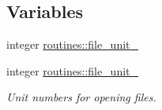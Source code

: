 \subsection*{Variables}
\begin{DoxyCompactItemize}
\item 
integer \mbox{\hyperlink{namespaceroutines_a4433ed4e6fbf0c81f38d8df1749be025}{routines\+::file\+\_\+unit\+\_}}
\item 
integer \mbox{\hyperlink{namespaceroutines_a806b34a65a0678e540be124100a0f908}{routines\+::file\+\_\+unit\+\_}}
\begin{DoxyCompactList}\small\item\em Unit numbers for opening files. \end{DoxyCompactList}\end{DoxyCompactItemize}
